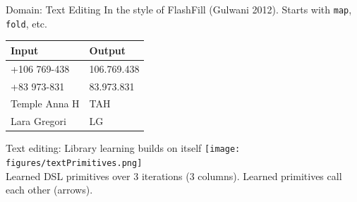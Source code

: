 \documentclass[aspectratio=169,final]{beamer}
\newcommand{\code}[1]{{\texttt{#1}}}
\begin{document}
\begin{frame}{Domain: Text Editing}
  In the style of FlashFill (Gulwani 2012). Starts with \code{map}, \code{fold}, etc.
  
  \centering
\vspace{1cm}
  \begin{tabular}{ll}
  
    \toprule
    Input&Output\\\midrule
    +106 769-438&106.769.438\\
    +83 973-831&83.973.831
    \\\midrule
          Temple Anna H&TAH\\
      Lara Gregori&LG
    \\\bottomrule 
  \end{tabular}
\end{frame}
\begin{frame}{Text editing: Library learning builds on itself}
\centering        \texttt{[image: figures/textPrimitives.png]}
\\      Learned DSL primitives over 3 iterations (3 columns). Learned primitives call each other (arrows).

  \end{frame}
\end{document}
